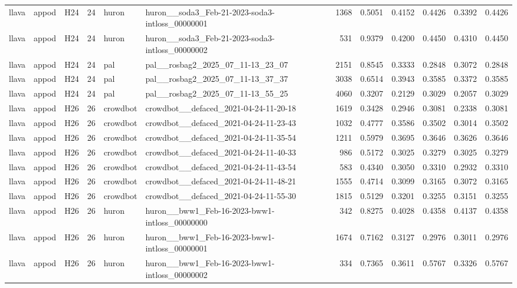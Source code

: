 \begin{table}[tbp]
\begin{tabular}{lllrllrrrrrr}
llava & appod & H24 & 24 & huron & huron\_\_soda3\_Feb-21-2023-soda3-intloss\_00000001 & 1368 & 0.5051 & 0.4152 & 0.4426 & 0.3392 & 0.4426 \\
llava & appod & H24 & 24 & huron & huron\_\_soda3\_Feb-21-2023-soda3-intloss\_00000002 & 531 & 0.9379 & 0.4200 & 0.4450 & 0.4310 & 0.4450 \\
llava & appod & H24 & 24 & pal & pal\_\_rosbag2\_2025\_07\_11-13\_23\_07 & 2151 & 0.8545 & 0.3333 & 0.2848 & 0.3072 & 0.2848 \\
llava & appod & H24 & 24 & pal & pal\_\_rosbag2\_2025\_07\_11-13\_37\_37 & 3038 & 0.6514 & 0.3943 & 0.3585 & 0.3372 & 0.3585 \\
llava & appod & H24 & 24 & pal & pal\_\_rosbag2\_2025\_07\_11-13\_55\_25 & 4060 & 0.3207 & 0.2129 & 0.3029 & 0.2057 & 0.3029 \\
llava & appod & H26 & 26 & crowdbot & crowdbot\_\_defaced\_2021-04-24-11-20-18 & 1619 & 0.3428 & 0.2946 & 0.3081 & 0.2338 & 0.3081 \\
llava & appod & H26 & 26 & crowdbot & crowdbot\_\_defaced\_2021-04-24-11-23-43 & 1032 & 0.4777 & 0.3586 & 0.3502 & 0.3014 & 0.3502 \\
llava & appod & H26 & 26 & crowdbot & crowdbot\_\_defaced\_2021-04-24-11-35-54 & 1211 & 0.5979 & 0.3695 & 0.3646 & 0.3626 & 0.3646 \\
llava & appod & H26 & 26 & crowdbot & crowdbot\_\_defaced\_2021-04-24-11-40-33 & 986 & 0.5172 & 0.3025 & 0.3279 & 0.3025 & 0.3279 \\
llava & appod & H26 & 26 & crowdbot & crowdbot\_\_defaced\_2021-04-24-11-43-54 & 583 & 0.4340 & 0.3050 & 0.3310 & 0.2932 & 0.3310 \\
llava & appod & H26 & 26 & crowdbot & crowdbot\_\_defaced\_2021-04-24-11-48-21 & 1555 & 0.4714 & 0.3099 & 0.3165 & 0.3072 & 0.3165 \\
llava & appod & H26 & 26 & crowdbot & crowdbot\_\_defaced\_2021-04-24-11-55-30 & 1815 & 0.5129 & 0.3201 & 0.3255 & 0.3151 & 0.3255 \\
llava & appod & H26 & 26 & huron & huron\_\_bww1\_Feb-16-2023-bww1-intloss\_00000000 & 342 & 0.8275 & 0.4028 & 0.4358 & 0.4137 & 0.4358 \\
llava & appod & H26 & 26 & huron & huron\_\_bww1\_Feb-16-2023-bww1-intloss\_00000001 & 1674 & 0.7162 & 0.3127 & 0.2976 & 0.3011 & 0.2976 \\
llava & appod & H26 & 26 & huron & huron\_\_bww1\_Feb-16-2023-bww1-intloss\_00000002 & 334 & 0.7365 & 0.3611 & 0.5767 & 0.3326 & 0.5767 \\

\end{tabular}
\end{table}

